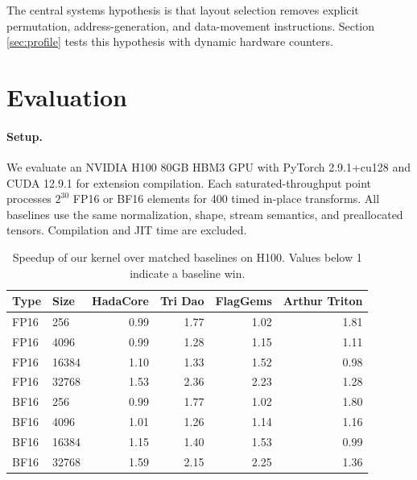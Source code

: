 \documentclass{article}
\begin{document}

The central systems hypothesis is that layout selection removes explicit
permutation, address-generation, and data-movement instructions. Section
\ref{sec:profile} tests this hypothesis with dynamic hardware counters.

\section{Evaluation}
\label{sec:evaluation}
\paragraph{Setup.}
We evaluate an NVIDIA H100 80GB HBM3 GPU with PyTorch 2.9.1+cu128 and CUDA
12.9.1 for extension compilation. Each saturated-throughput point processes
$2^{30}$ FP16 or BF16 elements for 400 timed in-place transforms. All baselines
use the same normalization, shape, stream semantics, and preallocated tensors.
Compilation and JIT time are excluded.


\begin{table}[t]
\caption{Speedup of our kernel over matched baselines on H100. Values below
1 indicate a baseline win.}
\label{tab:baselines}
\centering
\small
\begin{tabular}{llrrrr}
\toprule
Type & Size & HadaCore & Tri Dao & FlagGems & Arthur Triton \\
\midrule
FP16 & 256   & 0.99 & 1.77 & 1.02 & 1.81 \\
FP16 & 4096  & 0.99 & 1.28 & 1.15 & 1.11 \\
FP16 & 16384 & 1.10 & 1.33 & 1.52 & 0.98 \\
FP16 & 32768 & 1.53 & 2.36 & 2.23 & 1.28 \\
BF16 & 256   & 0.99 & 1.77 & 1.02 & 1.80 \\
BF16 & 4096  & 1.01 & 1.26 & 1.14 & 1.16 \\
BF16 & 16384 & 1.15 & 1.40 & 1.53 & 0.99 \\
BF16 & 32768 & 1.59 & 2.15 & 2.25 & 1.36 \\
\bottomrule
\end{tabular}
\end{table}
\end{document}
